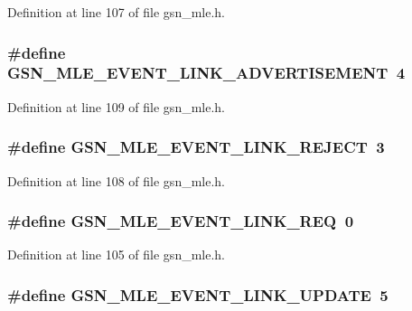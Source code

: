 Definition at line 107 of file gsn\_\-mle.h.

\hypertarget{a00527_a0d81797b692d547670462ce3cff36aea}{
\subsubsection[{GSN\_\-MLE\_\-EVENT\_\-LINK\_\-ADVERTISEMENT}]{\setlength{\rightskip}{0pt plus 5cm}\#define GSN\_\-MLE\_\-EVENT\_\-LINK\_\-ADVERTISEMENT~4}}
\label{a00527_a0d81797b692d547670462ce3cff36aea}


Definition at line 109 of file gsn\_\-mle.h.

\hypertarget{a00527_ab2c87c6f321a9873218ecbacc65b0dce}{
\subsubsection[{GSN\_\-MLE\_\-EVENT\_\-LINK\_\-REJECT}]{\setlength{\rightskip}{0pt plus 5cm}\#define GSN\_\-MLE\_\-EVENT\_\-LINK\_\-REJECT~3}}
\label{a00527_ab2c87c6f321a9873218ecbacc65b0dce}


Definition at line 108 of file gsn\_\-mle.h.

\hypertarget{a00527_a9d781976c514d4c27e18eba2bc5040c2}{
\subsubsection[{GSN\_\-MLE\_\-EVENT\_\-LINK\_\-REQ}]{\setlength{\rightskip}{0pt plus 5cm}\#define GSN\_\-MLE\_\-EVENT\_\-LINK\_\-REQ~0}}
\label{a00527_a9d781976c514d4c27e18eba2bc5040c2}


Definition at line 105 of file gsn\_\-mle.h.

\hypertarget{a00527_a6be437a6195684fe311501b5222d2de5}{
\subsubsection[{GSN\_\-MLE\_\-EVENT\_\-LINK\_\-UPDATE}]{\setlength{\rightskip}{0pt plus 5cm}\#define GSN\_\-MLE\_\-EVENT\_\-LINK\_\-UPDATE~5}}
\label{a00527_a6be437a6195684fe311501b5222d2de5}


